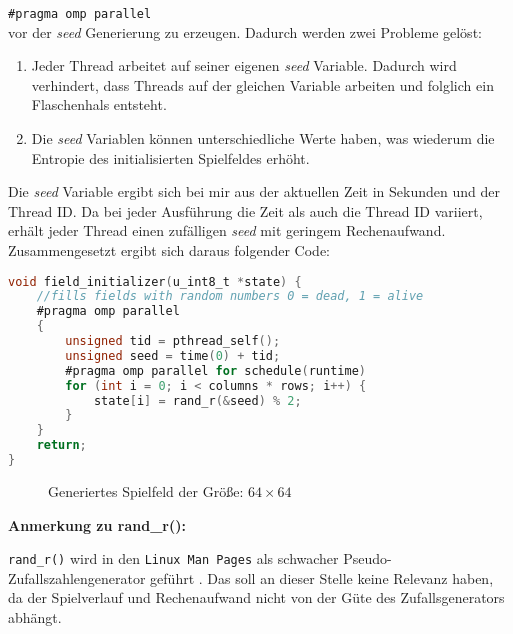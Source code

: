 \documentclass[german,plainarticle,hyperref,utf8]{zihpub}
\begin{document}
	\texttt{\#pragma omp parallel}\\
	
	vor der \textit{seed} Generierung zu erzeugen. Dadurch werden zwei Probleme gelöst:
	\begin{enumerate}
		\item Jeder Thread arbeitet auf seiner eigenen \textit{seed} Variable. Dadurch wird verhindert, dass Threads auf der gleichen Variable arbeiten und folglich ein Flaschenhals entsteht.
		\item Die \textit{seed} Variablen können unterschiedliche Werte haben, was wiederum die Entropie des initialisierten Spielfeldes erhöht.
	\end{enumerate}
	
	Die \textit{seed} Variable ergibt sich bei mir aus der aktuellen Zeit in Sekunden und der Thread ID. Da bei jeder Ausführung die Zeit als auch die Thread ID variiert, erhält jeder Thread einen zufälligen \textit{seed} mit geringem Rechenaufwand.\\
	
	Zusammengesetzt ergibt sich daraus folgender Code:\\
	
	\begin{lstlisting}[language=C, caption=Daten Initialisierung]
void field_initializer(u_int8_t *state) {
	//fills fields with random numbers 0 = dead, 1 = alive
	#pragma omp parallel
	{
		unsigned tid = pthread_self();
		unsigned seed = time(0) + tid;
		#pragma omp parallel for schedule(runtime)
		for (int i = 0; i < columns * rows; i++) {
			state[i] = rand_r(&seed) % 2;
		}
	}
	return;
}\end{lstlisting}
	\begin{figure}[h]
		\begin{center}
		\end{center}
		\caption{Generiertes Spielfeld der Größe: $64\times 64$}
	\end{figure}
	\newpage
	\textbf{Anmerkung zu rand\_r():}
	
	\texttt{rand\_r()} wird in den \texttt{Linux Man Pages} als schwacher Pseudo-Zufallszahlengenerator geführt \cite{lmp}. Das soll an dieser Stelle keine Relevanz haben, da der Spielverlauf und Rechenaufwand nicht von der Güte des Zufallsgenerators abhängt.
	
\end{document}

